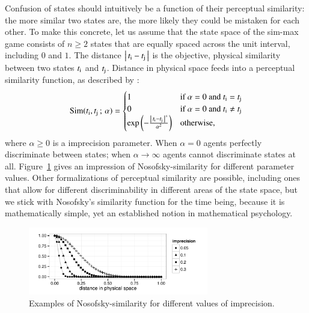 \documentclass[fleqn,reqno,10pt]{article}
\newcommand{\imprecision}{\ensuremath{\alpha}} %
\newcommand{\similarity}{\ensuremath{\mathrm{Sim}}} %
\begin{document}
Confusion of states should intuitively be a function of their
perceptual similarity: the more similar two states are, the more likely they could be mistaken for each other.
To make this concrete, let us assume that the
state space of the sim-max game consists of $n \ge 2$ states that are
equally spaced across the unit interval, including $0$ and $1$. The
distance $\left \lvert \, t_{\mathrm{i}} - t_{\mathrm{j}} \, \right\rvert$ is the objective, physical
similarity between two states $t_{\mathrm{i}}$ and
$t_{\mathrm{j}}$. Distance in physical space feeds into a perceptual
similarity function, as described by
\citet{Nosofsky1986:Attention-Simil}:
\begin{align*}
  \similarity(\mystate{i}, \mystate{j} \myts ; \myts \imprecision) =
      \begin{cases}
    1 & \textrm{if } \imprecision = 0 \textrm{ and } \mystate{i} = \mystate{j} \\
    0 & \textrm{if } \imprecision = 0 \textrm{ and } \mystate{i} \neq \mystate{j} \\
 \expo \left ( -  \frac{\card{\mystate{i} - \mystate{j}}^s}{ \imprecision^2} \right ) & \textrm{otherwise,} \\
    \end{cases}
\end{align*}
where $\imprecision \ge 0$ is a imprecision parameter. When $\imprecision=0$ agents perfectly
discriminate between states; when $\imprecision \rightarrow \infty$ agents cannot discriminate
states at all. Figure~\ref{fig:NosofskySim} gives an impression of Nosofsky-similarity for
different parameter values. Other formalizations of perceptual similarity are possible,
including ones that allow for different discriminability in different areas of the state space,
but we stick with Nosofsky's similarity function for the time being, because it is
mathematically simple, yet an established notion in mathematical psychology.

\begin{figure}
  \centering

  \includegraphics[width=0.7\textwidth]{plots/NosofskySim.pdf}

  \caption{Examples of Nosofsky-similarity for different values of
    imprecision.}
  \label{fig:NosofskySim}
\end{figure}
\end{document}
